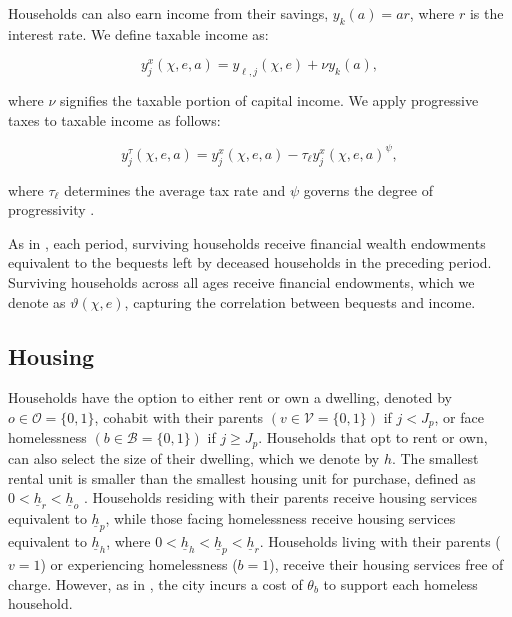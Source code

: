 \documentclass[parskip=full]{article}
\begin{document}
Households can also earn income from their savings, $y_{k}(a)=ar$, where $r$ is the interest rate. We define taxable income as:

\begin{equation*}\label{eq:taxable_labor_income}
  y^{x}_{j}(\chi,e,a) =y_{\ell,j}(\chi,e)+\nu y_{k}(a),
\end{equation*}

\noindent where $\nu$ signifies the taxable portion of capital income. We apply progressive taxes to taxable income as follows:

\begin{equation}\label{eq:income_tax}
  y^{\tau}_{j}(\chi,e,a) = y^{x}_{j}(\chi,e,a)-\tau_{\ell}y^{x}_{j}(\chi,e,a)^{\psi},
\end{equation}

\noindent where $\tau_{\ell}$ determines the average tax rate and $\psi$ governs the degree of progressivity \citep{hsv-2020}.

As in \citet{kkk-2021}, each period, surviving households receive financial wealth endowments equivalent to the bequests left by deceased households in the preceding period. Surviving households across all ages receive financial endowments, which we denote as $\vartheta (\chi,e)$, capturing the correlation between bequests and income.

\subsection{Housing}\label{subsection:housing_choice}

Households have the option to either rent or own a dwelling, denoted by $o \in \mathcal{O}=\{0,1\}$, cohabit with their parents $\left(v \in \mathcal{V}=\{0,1\}\right)$ if $j<J_{p}$, or face homelessness $\left(b \in \mathcal{B}=\{0,1\}\right)$ if $j \geq J_{p}$. Households that opt to rent or own, can also select the size of their dwelling, which we denote by $h$. The smallest rental unit is smaller than the smallest housing unit for purchase, defined as $0<\underline{h}_{r}<\underline{h}_{o}$ \citep{gervais,sommeretal-2013,sommersullivan-2017,kaplanetal-2019}. Households residing with their parents receive housing services equivalent to $\underline{h}_{p}$, while those facing homelessness receive housing services equivalent to $\underline{h}_{h}$, where $0<\underline{h}_{h}<\underline{h}_{p}<\underline{h}_{r}$. Households living with their parents ($v=1$) or experiencing homelessness ($b=1$), receive their housing services free of charge. However, as in \citet{abramson-2024}, the city incurs a cost of $\theta_{b}$ to support each homeless household.
\end{document}
